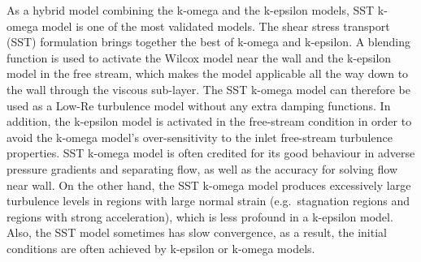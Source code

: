 
As a hybrid model combining the k-omega and the k-epsilon models, SST k-omega model is one of the most validated models. The shear stress transport (SST) formulation brings together the best of k-omega and k-epsilon. A blending function is used to activate the Wilcox model near the wall and the k-epsilon model in the free stream, which makes the model applicable all the way down to the wall through the viscous sub-layer. The SST k-omega model can therefore be used as a Low-Re turbulence model without any extra damping functions. In addition, the k-epsilon model is activated in the free-stream condition in order to avoid the k-omega model's over-sensitivity to the inlet free-stream turbulence properties. SST k-omega model is often credited for its good behaviour in adverse pressure gradients and separating flow, as well as the accuracy for solving flow near wall. On the other hand, the SST k-omega model produces excessively large turbulence levels in regions with large normal strain (e.g.\ stagnation regions and regions with strong acceleration), which is less profound in a k-epsilon model. Also, the SST model sometimes has slow convergence, as a result, the initial conditions are often achieved by k-epsilon or k-omega models.
\cite{sstkocfdwiki,sstkomega2013}








